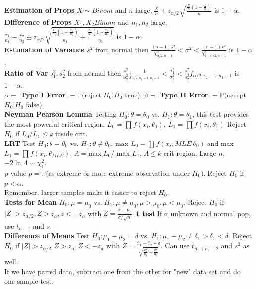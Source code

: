 \documentclass[10pt]{article}
\begin{document}
{\bf Estimation of Props} $X\sim Binom$ and $n$ large, $\frac{X}{n}\pm z_{\alpha/2}\sqrt{\frac{\frac{X}{n}(1-\frac{X}{n})}{n}}$ is $1-\alpha$.\\
{\bf Difference of Props} $X_1,X_2 Binom$ and $n_1,n_2$ large, $\frac{x_1}{n_1}-\frac{x_2}{n_2}\pm z_{\alpha/2}\sqrt{\frac{\frac{x_1}{n_1}(1-\frac{x_1}{n_1})}{n_1}+\frac{\frac{x_2}{n_2}(1-\frac{x_2}{n_2})}{n_2}}$ is $1-\alpha$.\\ {\bf Estimation of Variance} $s^2$ from normal then $\frac{(n-1)s^2}{\chi^2_{\alpha/2,n-1}}<\sigma^2<\frac{(n-1)s^2}{\chi^2_{1-\alpha/2,n-1}}$ is $1-\alpha$.\\
{\bf Ratio of Var} $s_1^2,s_2^2$ from normal then $\frac{s_1^2}{s_2^2}\frac{1}{f_{\alpha/2,n_1-1,n_2-1}}<\frac{\sigma_1^2}{\sigma_2^2}<\frac{s_1^2}{s_2^2}f_{\alpha/2,n_2-1,n_1-1}$ is $1-\alpha$.\\
$\alpha=$ {\bf Type I Error} $=\mathbb P($reject $H_0| H_0$ true). $\beta=$ {\bf Type II Error} $=\mathbb P($accept $H_0| H_0$ false).\\
{\bf Neyman Pearson Lemma} Testing $H_0:\theta=\theta_0$ vs. $H_1:\theta=\theta_1$, this test provides the most powerful critical region.
$L_0=\prod f(x_i,\theta_0),\ L_1=\prod f(x_i,\theta_1)$ Reject $H_0$ if $L_0/L_1\leq k$ inside crit.\\
{\bf LRT} Test $H_0:\theta=\theta_0$ vs. $H_1:\theta\neq\theta_0$. max $L_0=\prod f(x_i, MLE\ \theta_0)$ and max $L_1=\prod f(x_i,\theta_{MLE})$. $\Lambda=$max $L_0$/ max $L_1$, $\Lambda \leq k$ crit region. Large $n$, $-2\ln\Lambda\sim\chi^2_1$.\\
p-value $p=\mathbb P($as extreme or more extreme observation under $H_0)$. Reject $H_0$ if $p<\alpha$.\\
Remember, larger samples make it easier to reject $H_0$.\\
{\bf Tests for Mean} $H_0:\mu=\mu_0$ vs. $H_1:\mu\neq\mu_0,\mu>\mu_0,\mu<\mu_0$. Reject $H_0$ if $|Z|>z_{\alpha/2},Z>z_{\alpha}, z<-z_{\alpha}$ with $Z=\frac{\bar x-\mu_0}{\sigma/\sqrt n}$. {\bf t test} If $\sigma$ unknown and normal pop, use $t_{n-1}$ and $s$.\\
{\bf Difference of Means} Test $H_0:\mu_1-\mu_2=\delta$ vs. $H_1: \mu_1-\mu_2\neq\delta,>\delta,<\delta$. Reject $H_0$ if $|Z|>z_{\alpha/2},Z>z_{\alpha},Z<-z_{\alpha}$ with $Z=\frac{\bar x_1-\bar x_2-\delta}{\sqrt{\frac{\sigma_1^2}{n_1}+\frac{\sigma_2^2}{n_2}}}$. Can use $t_{n_1+n_2-2}$ and $s^2$ as well.\\
If we have paired data, subtract one from the other for "new" data set and do one-sample test.\\
\end{document}
